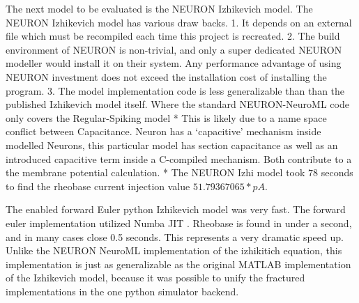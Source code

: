 The next model to be evaluated is the NEURON Izhikevich model. The NEURON Izhikevich model has various draw backs. 1. It depends on an external file which must be recompiled each time this project is recreated. 2. The build environment of NEURON is non-trivial, and only a super dedicated NEURON modeller would install it on their system. Any performance advantage of using NEURON investment does not exceed the installation cost of installing the program. 3. The model implementation code is less generalizable than than the published Izhikevich model itself. Where the standard NEURON-NeuroML code only covers the Regular-Spiking model * This is likely due to a name space conflict between Capacitance. Neuron has a `capacitive' mechanism inside modelled Neurons, this particular model has section capacitance as well as an introduced capacitive term inside a C-compiled mechanism. Both contribute to a the membrane
potential calculation. * The NEURON Izhi model took $78$ seconds to find the rheobase current injection value $ 51.79367065 * pA $.

    




        
The enabled forward Euler python Izhikevich model was very fast. The forward euler
implementation utilized Numba JIT \cite{lam2015numba}. Rheobase is found in under a second,
and in many cases close 0.5 seconds. This represents a very dramatic
speed up. Unlike the NEURON NeuroML implementation of the izhikitich equation,
this implementation is just as generalizable as the original MATLAB
implementation of the Izhikevich model, because it was possible to unify the fractured implementations in the one python simulator backend.


        

